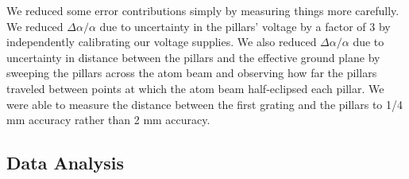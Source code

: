 \documentclass[twocolumn, prl,showpacs,superscriptaddress]{revtex4-1}   %
\begin{document}
We reduced some error contributions simply by measuring things more carefully. We reduced $\Delta\alpha/\alpha$ due to uncertainty in the pillars' voltage by a factor of 3 by independently calibrating our voltage supplies. We also reduced $\Delta\alpha/\alpha$ due to uncertainty in distance between the pillars and the effective ground plane by sweeping the pillars across the atom beam and observing how far the pillars traveled between points at which the atom beam half-eclipsed each pillar. We were able to measure the distance between the first grating and the pillars to 1/4 mm accuracy rather than 2 mm accuracy. 

\subsection{Data Analysis}
\end{document}

